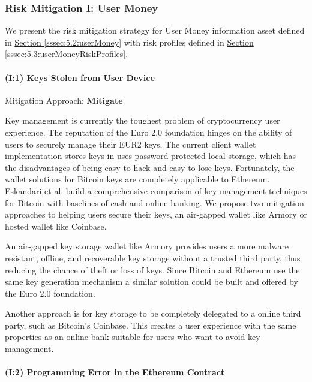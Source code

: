 \documentclass[a4paper,12pt]{article} %
\newcommand{\hypersectionref}[1]{\hyperref[#1]{Section \ref{#1}}}
\begin{document}
{\subsubsection{Risk Mitigation I: User Money} \label{sssec:5.4:riskMitigationUserMoney}

We present the risk mitigation strategy for User Money information asset defined in \hypersectionref{sssec:5.2:userMoney} with risk profiles defined in \hypersectionref{sssec:5.3:userMoneyRiskProfiles}.

\paragraph{(I:1) Keys Stolen from User Device}

Mitigation Approach: \textbf{Mitigate}

Key management is currently the toughest problem of cryptocurrency user experience. The reputation of the Euro 2.0 foundation hinges on the ability of users to securely manage their EUR2 keys. The current client wallet implementation stores keys in uses password protected local storage, which has the disadvantages of being easy to hack and easy to lose keys. Fortunately, the wallet solutions for Bitcoin keys are completely applicable to Ethereum. Eskandari et al. build a comprehensive comparison of key management techniques for Bitcoin with baselines of cash and online banking\cite{Eskandari2015}. We propose two mitigation approaches to helping users secure their keys, an air-gapped wallet like Armory or hosted wallet like Coinbase.

An air-gapped key storage wallet like Armory\cite{bitcoinArmory} provides users a more malware resistant, offline, and recoverable key storage without a trusted third party, thus reducing the chance of theft or loss of keys. Since Bitcoin and Ethereum use the same key generation mechanism a similar solution could be built and offered by the Euro 2.0 foundation.

Another approach is for key storage to be completely delegated to a online third party, such as Bitcoin's Coinbase. This creates a user experience with the same properties as an online bank\cite{Eskandari2015} suitable for users who want to avoid key management.

\paragraph{(I:2) Programming Error in the Ethereum Contract}

}
\end{document}
